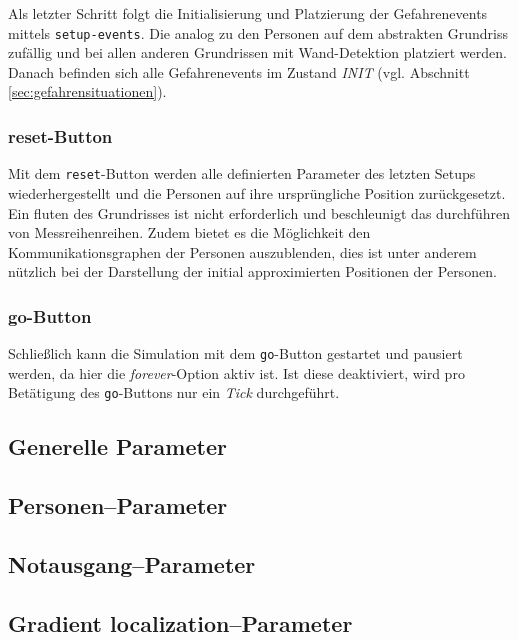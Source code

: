 Als letzter Schritt folgt die Initialisierung und Platzierung der Gefahrenevents  mittels \verb|setup-events|. Die analog zu den Personen auf dem abstrakten Grundriss zufällig und bei allen anderen Grundrissen mit Wand-Detektion platziert werden. Danach befinden sich alle Gefahrenevents im Zustand \emph{INIT} (vgl. Abschnitt \ref{sec:gefahrensituationen}).
 
\subsubsection*{reset-Button}

Mit dem \verb|reset|-Button werden alle definierten Parameter des letzten Setups wiederhergestellt und die Personen auf ihre ursprüngliche Position zurückgesetzt.
Ein fluten des Grundrisses ist nicht erforderlich und beschleunigt das durchführen von Messreihenreihen.
Zudem bietet es die Möglichkeit den Kommunikationsgraphen der Personen auszublenden, dies ist unter anderem nützlich bei der Darstellung der initial approximierten Positionen der Personen.

\subsubsection*{go-Button}

Schließlich kann die Simulation mit dem \verb|go|-Button gestartet und pausiert werden, da hier die \emph{forever}-Option aktiv ist. Ist diese deaktiviert, wird pro Betätigung des \verb|go|-Buttons nur ein \emph{Tick} durchgeführt.

\subsection{Generelle Parameter}
\label{sec:gui_general}

\subsection{Personen--Parameter}
\label{sec:gui_person}

\subsection{Notausgang--Parameter}
\label{sec:gui_exit}

\subsection{Gradient localization--Parameter}
\label{sec:gui_localization}


